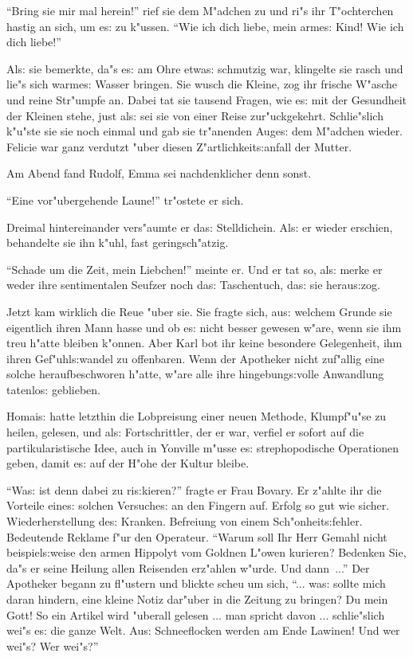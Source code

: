 \documentclass[oneside,12pt]{book}
\newcommand{\s}{s:}%
\begin{document}
"`Bring sie mir mal herein!"' rief sie dem M"adchen zu und ri"s
ihr T"ochterchen hastig an sich, um e{\s} zu k"ussen. "`Wie ich
dich liebe, mein arme{\s} Kind! Wie ich dich liebe!"'

Al{\s} sie bemerkte, da"s e{\s} am Ohre etwa{\s} schmutzig war,
klingelte sie rasch und lie"s sich warme{\s} Wasser bringen. Sie
wusch die Kleine, zog ihr frische W"asche und reine Str"umpfe an.
Dabei tat sie tausend Fragen, wie e{\s} mit der Gesundheit der
Kleinen stehe, just al{\s} sei sie von einer Reise zur"uckgekehrt.
Schlie"slich k"u"ste sie sie noch einmal und gab sie tr"anenden
Auge{\s} dem M"adchen wieder. Felicie war ganz verdutzt "uber
diesen Z"artlichkeit{\s}anfall der Mutter.

Am Abend fand Rudolf, Emma sei nachdenklicher denn sonst.

"`Eine vor"ubergehende Laune!"' tr"ostete er sich.

Dreimal hintereinander vers"aumte er da{\s} Stelldichein. Al{\s}
er wieder erschien, behandelte sie ihn k"uhl, fast geringsch"atzig.

"`Schade um die Zeit, mein Liebchen!"' meinte er. Und er tat so,
al{\s} merke er weder ihre sentimentalen Seufzer noch da{\s}
Taschentuch, da{\s} sie herau{\s}zog.

Jetzt kam wirklich die Reue "uber sie. Sie fragte sich, au{\s}
welchem Grunde sie eigentlich ihren Mann hasse und ob e{\s} nicht
besser gewesen w"are, wenn sie ihm treu h"atte bleiben k"onnen.
Aber Karl bot ihr keine besondere Gelegenheit, ihm ihren
Gef"uhl{\s}wandel zu offenbaren. Wenn der Apotheker nicht
zuf"allig eine solche heraufbeschworen h"atte, w"are alle ihre
hingebung{\s}volle Anwandlung tatenlo{\s} geblieben.


\newpage\begin{center}
{\large \so{Elfte{\s} Kapitel}}\bigskip\bigskip
\end{center}

Homai{\s} hatte letzthin die Lobpreisung einer neuen Methode,
Klumpf"u"se zu heilen, gelesen, und al{\s} Fortschrittler, der er
war, verfiel er sofort auf die partikularistische Idee, auch in
Yonville m"usse e{\s} strephopodische Operationen geben, damit
e{\s} auf der H"ohe der Kultur bleibe.

"`Wa{\s} ist denn dabei zu ri{\s}kieren?"' fragte er Frau Bovary.
Er z"ahlte ihr die Vorteile eine{\s} solchen Versuche{\s} an den
Fingern auf. Erfolg so gut wie sicher. Wiederherstellung de{\s}
Kranken. Befreiung von einem Sch"onheit{\s}fehler. Bedeutende
Reklame f"ur den Operateur. "`Warum soll Ihr Herr Gemahl nicht
beispiel{\s}weise den armen Hippolyt vom Goldnen L"owen kurieren?
Bedenken Sie, da"s er seine Heilung allen Reisenden erz"ahlen
w"urde. Und dann~..."' Der Apotheker begann zu fl"ustern und
blickte scheu um sich, "`... wa{\s} sollte mich daran hindern,
eine kleine Notiz dar"uber in die Zeitung zu bringen? Du mein
Gott! So ein Artikel wird "uberall gelesen ... man spricht davon
... schlie"slich wei"s e{\s} die ganze Welt. Au{\s} Schneeflocken
werden am Ende Lawinen! Und wer wei"s? Wer wei"s?"'
\end{document}
